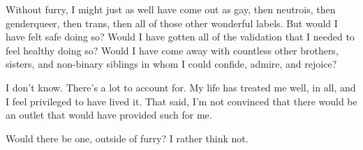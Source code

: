 Without furry, I might just as well have come out as gay, then neutrois, then genderqueer, then trans, then all of those other wonderful labels.  But would I have felt safe doing so?  Would I have gotten all of the validation that I needed to feel healthy doing so?  Would I have come away with countless other brothers, sisters, and non-binary siblings in whom I could confide, admire, and rejoice?

I don't know.  There's a lot to account for.  My life has treated me well, in all, and I feel privileged to have lived it.  That said, I'm not convinced that there would be an outlet that would have provided such for me.

Would there be one, outside of furry?  I rather think not.
